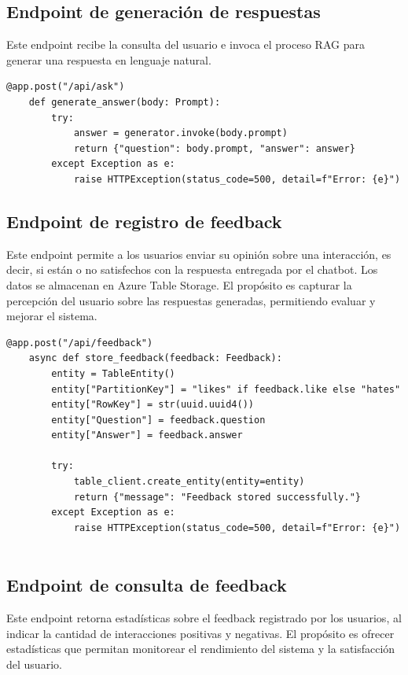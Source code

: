 \subsection{Endpoint de generación de respuestas}

Este endpoint recibe la consulta del usuario e invoca el proceso RAG para generar una respuesta en lenguaje natural.

\begin{lstlisting}[label=cod:api-1,caption=Endpoint de generación de respuestas.]
	@app.post("/api/ask")
	def generate_answer(body: Prompt):
		try:
			answer = generator.invoke(body.prompt)
			return {"question": body.prompt, "answer": answer}
		except Exception as e:
			raise HTTPException(status_code=500, detail=f"Error: {e}")	
\end{lstlisting}

\subsection{Endpoint de registro de feedback}

Este endpoint permite a los usuarios enviar su opinión sobre una interacción, es decir, si están o no satisfechos con 
la respuesta entregada por el chatbot. Los datos se almacenan en Azure Table Storage.
El propósito es capturar la percepción del usuario sobre las respuestas generadas, permitiendo evaluar y mejorar el sistema.

\begin{lstlisting}[label=cod:api-2,caption=Endpoint de registro de feedback.]
	@app.post("/api/feedback")
	async def store_feedback(feedback: Feedback):
		entity = TableEntity()
		entity["PartitionKey"] = "likes" if feedback.like else "hates"
		entity["RowKey"] = str(uuid.uuid4())
		entity["Question"] = feedback.question
		entity["Answer"] = feedback.answer
	
		try:
			table_client.create_entity(entity=entity)
			return {"message": "Feedback stored successfully."}
		except Exception as e:
			raise HTTPException(status_code=500, detail=f"Error: {e}")
	
\end{lstlisting}

\subsection{Endpoint de consulta de feedback}

Este endpoint retorna estadísticas sobre el feedback registrado por los usuarios, al indicar la cantidad de interacciones 
positivas y negativas. El propósito es ofrecer estadísticas que permitan monitorear el rendimiento del sistema y 
la satisfacción del usuario.

